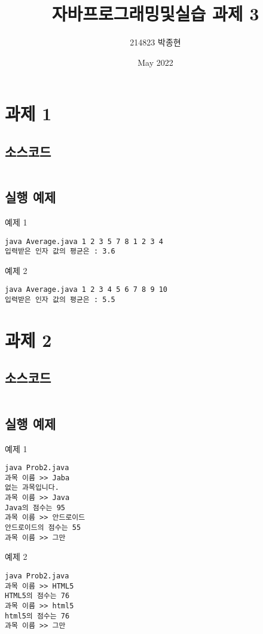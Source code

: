 \documentclass{article}
\title{자바프로그래밍및실습 과제 3}
\author{214823 박종현}
\date{May 2022}
\theoremstyle{nonumberplain}
\begin{document}
\maketitle
\pagebreak



\section{과제 1}
\subsection{소스코드}
\begin{code}
\inputminted{java}{java/Prob1/Average.java}
\end{code}

\subsection{실행 예제}
예제 1
\begin{code}
\begin{verbatim}
java Average.java 1 2 3 5 7 8 1 2 3 4
입력받은 인자 값의 평균은 : 3.6
\end{verbatim}
\end{code}
예제 2
\begin{code}
\begin{verbatim}
java Average.java 1 2 3 4 5 6 7 8 9 10          
입력받은 인자 값의 평균은 : 5.5
\end{verbatim}
\end{code}



\section{과제 2}
\subsection{소스코드}
\begin{code}
\inputminted{java}{java/Prob2.java}
\end{code}

\subsection{실행 예제}
예제 1
\begin{code}
\begin{verbatim}
java Prob2.java
과목 이름 >> Jaba
없는 과목입니다.
과목 이름 >> Java
Java의 점수는 95
과목 이름 >> 안드로이드
안드로이드의 점수는 55
과목 이름 >> 그만
\end{verbatim}
\end{code}
예제 2
\begin{code}
\begin{verbatim}
java Prob2.java
과목 이름 >> HTML5
HTML5의 점수는 76
과목 이름 >> html5
html5의 점수는 76
과목 이름 >> 그만
\end{verbatim}
\end{code}
\end{document}

